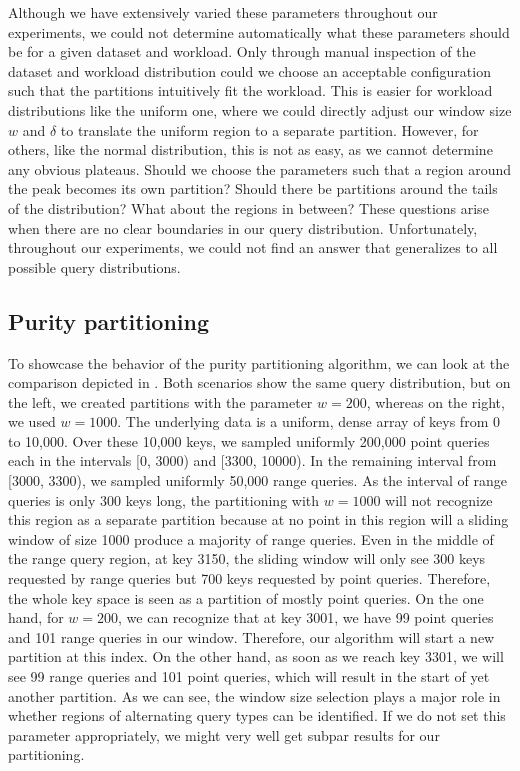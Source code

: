 Although we have extensively varied these parameters throughout our experiments, we could not determine automatically what these parameters should be for a given dataset and workload. Only through manual inspection of the dataset and workload distribution could we choose an acceptable configuration such that the partitions intuitively fit the workload. This is easier for workload distributions like the uniform one, where we could directly adjust our window size $w$ and $\delta$ to translate the uniform region to a separate partition. However, for others, like the normal distribution, this is not as easy, as we cannot determine any obvious plateaus. Should we choose the parameters such that a region around the peak becomes its own partition? Should there be partitions around the tails of the distribution? What about the regions in between? These questions arise when there are no clear boundaries in our query distribution. Unfortunately, throughout our experiments, we could not find an answer that generalizes to all possible query distributions.

\subsection{Purity partitioning}
To showcase the behavior of the purity partitioning algorithm, we can look at the comparison depicted in . Both scenarios show the same query distribution, but on the left, we created partitions with the parameter $w = 200$, whereas on the right, we used $w = 1000$. The underlying data is a uniform, dense array of keys from 0 to 10,000. Over these 10,000 keys, we sampled uniformly 200,000 point queries each in the intervals [0, 3000) and [3300, 10000). In the remaining interval from [3000, 3300), we sampled uniformly 50,000 range queries. As the interval of range queries is only 300 keys long, the partitioning with $w = 1000$ will not recognize this region as a separate partition because at no point in this region will a sliding window of size 1000 produce a majority of range queries. Even in the middle of the range query region, at key 3150, the sliding window will only see 300 keys requested by range queries but 700 keys requested by point queries. Therefore, the whole key space is seen as a partition of mostly point queries. On the one hand, for $w = 200$, we can recognize that at key 3001, we have 99 point queries and 101 range queries in our window. Therefore, our algorithm will start a new partition at this index. On the other hand, as soon as we reach key 3301, we will see 99 range queries and 101 point queries, which will result in the start of yet another partition. As we can see, the window size selection plays a major role in whether regions of alternating query types can be identified. If we do not set this parameter appropriately, we might very well get subpar results for our partitioning.

